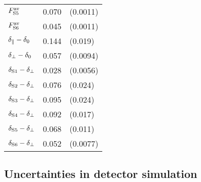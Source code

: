 \begin{table}[htbp]
\begin{tabular}{lll}
    $\FSAv[5]$           &  0.070  &  (0.0011)                         \\
    $\FSAv[6]$           &  0.045  &  (0.0011)                         \\
    \hline
    $\delpar-\delzero$   &  0.144  &  (0.019)                          \\
    $\delperp-\delzero$  &  0.057  &  (0.0094)                         \\
    $\delS[1]-\delperp$  &  0.028  &  (0.0056)                         \\
    $\delS[2]-\delperp$  &  0.076  &  (0.024)                          \\
    $\delS[3]-\delperp$  &  0.095  &  (0.024)                          \\
    $\delS[4]-\delperp$  &  0.092  &  (0.017)                          \\
    $\delS[5]-\delperp$  &  0.068  &  (0.011)                          \\
    $\delS[6]-\delperp$  &  0.052  &  (0.0077)                         \\
    \hline
  \end{tabular}
\end{table}


\subsection{Uncertainties in detector simulation}
\label{subsec:syst_angAcc_sim}

